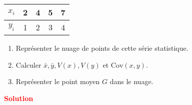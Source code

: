 \documentclass[12pt,a4paper]{article}
\begin{document}
\vspace{0.5cm}

\begin{center}
\begin{tabular}{|c|c|c|c|c|}
\hline
\( x_i \) & 2 & 4 & 5 & 7 \\
\hline
\( y_i \) & 1 & 2 & 3 & 4 \\
\hline
\end{tabular}
\end{center}

\vspace{0.5cm}

\begin{enumerate}
    \item Représenter le nuage de points de cette série statistique.
    \item Calculer \( \bar{x}, \bar{y}, V(x), V(y) \) et \( \text{Cov}(x, y) \).
    \item Représenter le point moyen \( G \) dans le nuage.
\end{enumerate}
\noindent \textbf{\textcolor{red}{Solution}}
\end{document}
